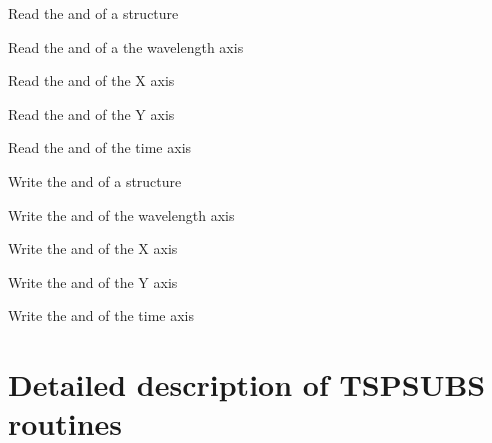 \begin{mansectionroutines}
     Read the {} and {} of a structure

     Read the {} and {} of a the wavelength axis

     Read the {} and {} of the X axis

     Read the {} and {} of the Y axis

     Read the {} and {} of the time axis

     Write the {} and {} of a structure

     Write the {} and {} of the wavelength axis

     Write the {} and {} of the X axis

     Write the {} and {} of the Y axis

     Write the {} and {} of the time axis

\end{mansectionroutines}


\newpage

\section{Detailed description of TSPSUBS routines}

